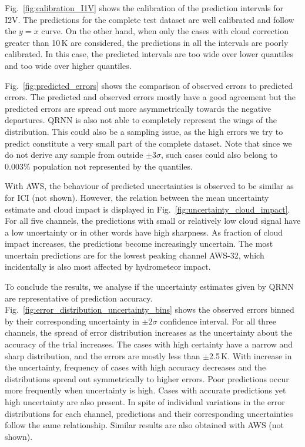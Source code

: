 \documentclass[amt, manuscript]{copernicus}
\begin{document}
Fig.~\ref{fig:calibration_I1V} shows the calibration of the prediction intervals for I2V. The predictions for the complete test dataset are well calibrated and follow the $y =x$ curve. On the other hand, when only the cases with  cloud correction greater than 10\,K are considered, the predictions in all the intervals are poorly calibrated. In this case, the predicted intervals are too wide over lower quantiles and too wide over higher quantiles. 

Fig.~\ref{fig:predicted_errors} shows the comparison of observed errors to predicted errors. The predicted and observed errors mostly have a good agreement but the predicted errors are spread out more asymmetrically towards the negative departures. QRNN is also not able to completely represent the wings of the distribution. This could also be a sampling issue, as the high errors we try to predict constitute a very small part of the complete dataset. Note that since we do not derive any sample from outside $\pm3\sigma$, such cases could also belong to 0.003\% population not represented by the quantiles.   

With AWS, the behaviour of predicted uncertainties is observed to be similar as for ICI (not shown). However, the relation between the mean uncertainty estimate and cloud impact is displayed in Fig.~\ref{fig:uncertainty_cloud_impact}. For all five channels, the predictions with small or relatively low cloud signal have a low uncertainty or in other words have high sharpness. As fraction of cloud impact increases, the predictions become increasingly uncertain. The most uncertain predictions are for the lowest peaking channel AWS-32, which incidentally is also most affected by  hydrometeor impact.  

To conclude the results, we analyse if the uncertainty estimates given by QRNN are representative of prediction accuracy. Fig.~\ref{fig:error_distribution_uncertainty_bins} shows the observed errors binned by their corresponding uncertainty in $\pm2\sigma$  confidence interval. For all three channels, the spread of error distribution increases as the uncertainty about the accuracy of the trial increases. The cases with high certainty have a narrow and sharp distribution, and the errors are mostly less than $\pm$2.5\,K. With increase in the uncertainty, frequency of cases with high accuracy decreases and the distributions spread out symmetrically to higher errors. Poor predictions occur more frequently when uncertainty is high. Cases with accurate predictions yet high uncertainty are also present. In spite of individual variations in the error distributions for each channel, predictions and their corresponding uncertainties follow the same relationship. Similar results are also obtained with AWS (not shown). 
\end{document}
